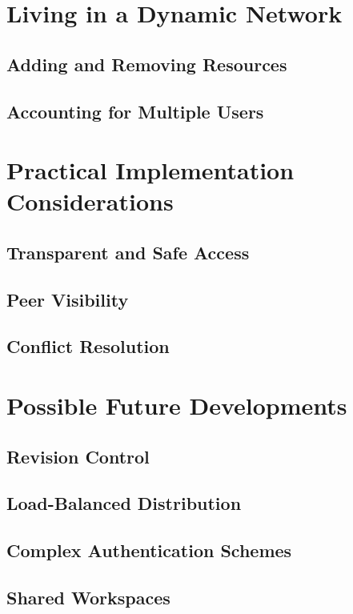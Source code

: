 \documentclass[11pt]{article}
\begin{document}
\begin{mainmatter}
\section{Living in a Dynamic Network}
\label{dynamic}

\subsection{Adding and Removing Resources}

\subsection{Accounting for Multiple Users}

\section{Practical Implementation Considerations}

\subsection{Transparent and Safe Access}
\label{access}
\subsection{Peer Visibility}

\subsection{Conflict Resolution}

\section{Possible Future Developments}

\subsection{Revision Control}

\subsection{Load-Balanced Distribution}

\subsection{Complex Authentication Schemes}

\subsection{Shared Workspaces}

\end{mainmatter}
\end{document}
